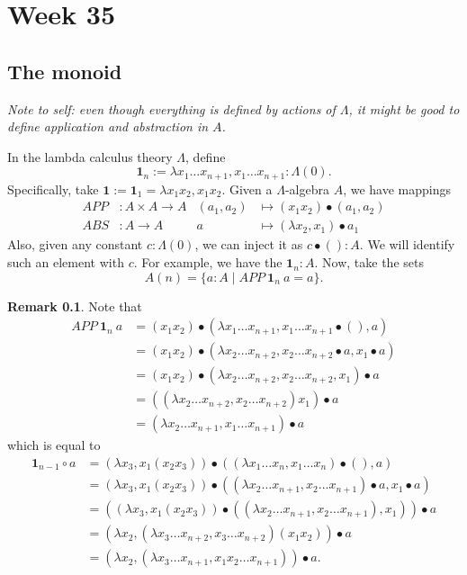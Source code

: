 \documentclass{amsbook}
\theoremstyle{definition}
\newtheorem{remark}{Remark}
\begin{document}
  \chapter*{Week 35}
  \section{The monoid}
  \textit{Note to self: even though everything is defined by actions of $ \Lambda $, it might be good to define application and abstraction in $ A $.}

  In the lambda calculus theory $ \Lambda $, define
  \[ \mathbf 1_n := \lambda x_1 \dots x_{n + 1}, x_1 \dots x_{n + 1} : \Lambda(0). \]
  Specifically, take $ \mathbf 1 := \mathbf 1_1 = \lambda x_1 x_2, x_1 x_2 $. Given a $ \Lambda $-algebra $ A $, we have mappings
  \begin{align*}
    APP&: A \times A \to A & (a_1, a_2) &\mapsto (x_1 x_2) \bullet (a_1, a_2)\\
    ABS&: A \to A & a &\mapsto (\lambda x_2, x_1) \bullet a_1
  \end{align*}
  Also, given any constant $ c: \Lambda(0) $, we can inject it as $ c \bullet () : A $. We will identify such an element with $ c $. For example, we have the $ \mathbf 1_n : A $. Now, take the sets
  \[ A(n) = \{ a: A \mid APP\ \mathbf 1_n\ a = a \}. \]
  \begin{remark}
    Note that
    \begin{align*}
      APP\ \mathbf 1_n\ a &= (x_1 x_2) \bullet (\lambda x_1 \dots x_{n + 1}, x_1 \dots x_{n + 1} \bullet (), a)\\
      &= (x_1 x_2) \bullet (\lambda x_2 \dots x_{n + 2}, x_2 \dots x_{n + 2} \bullet a, x_1 \bullet a)\\
      &= (x_1 x_2) \bullet (\lambda x_2 \dots x_{n + 2}, x_2 \dots x_{n + 2}, x_1) \bullet a\\
      &= ((\lambda x_2 \dots x_{n + 2}, x_2 \dots x_{n + 2}) x_1) \bullet a\\
      &= (\lambda x_2 \dots x_{n + 1}, x_1 \dots x_{n + 1}) \bullet a
    \end{align*}
    which is equal to
    \begin{align*}
      \mathbf 1_{n - 1} \circ a &= (\lambda x_3, x_1 (x_2 x_3)) \bullet ((\lambda x_1 \dots x_n, x_1 \dots x_n) \bullet (), a)\\
      &= (\lambda x_3, x_1 (x_2 x_3)) \bullet ((\lambda x_2 \dots x_{n + 1}, x_2 \dots x_{n + 1}) \bullet a, x_1 \bullet a)\\
      &= ((\lambda x_3, x_1 (x_2 x_3)) \bullet ((\lambda x_2 \dots x_{n + 1}, x_2 \dots x_{n + 1}), x_1)) \bullet a\\
      &= (\lambda x_2, (\lambda x_3 \dots x_{n + 2}, x_3 \dots x_{n + 2}) (x_1 x_2)) \bullet a\\
      &= (\lambda x_2, (\lambda x_3 \dots x_{n + 1}, x_1 x_2 \dots x_{n + 1})) \bullet a.
    \end{align*}
  \end{remark}
\end{document}
